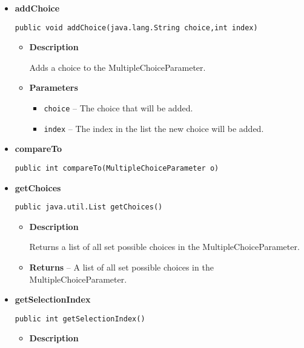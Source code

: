 {{{{{{{\begin{itemize}
{\begin{itemize}
{Let the visitor visit this parameter.
}
\item{
{\bf  Parameters}
  \begin{itemize}
   \item{
\texttt{visitor} -- The visitor to visit}
  \end{itemize}
}%
\end{itemize}
}%
\item{ 
{\bf  addChoice}\\
\begin{lstlisting}[frame=none]
public void addChoice(java.lang.String choice,int index)\end{lstlisting} %
\begin{itemize}
\item{
{\bf  Description}

Adds a choice to the MultipleChoiceParameter.
}
\item{
{\bf  Parameters}
  \begin{itemize}
   \item{
\texttt{choice} -- The choice that will be added.}
   \item{
\texttt{index} -- The index in the list the new choice will be added.}
  \end{itemize}
}%
\end{itemize}
}%
\item{ 
{\bf  compareTo}\\
\begin{lstlisting}[frame=none]
public int compareTo(MultipleChoiceParameter o)\end{lstlisting} %
}%
\item{ 
{\bf  getChoices}\\
\begin{lstlisting}[frame=none]
public java.util.List getChoices()\end{lstlisting} %
\begin{itemize}
\item{
{\bf  Description}

Returns a list of all set possible choices in the MultipleChoiceParameter.
}
\item{{\bf  Returns} -- 
A list of all set possible choices in the MultipleChoiceParameter. 
}%
\end{itemize}
}%
\item{ 
{\bf  getSelectionIndex}\\
\begin{lstlisting}[frame=none]
public int getSelectionIndex()\end{lstlisting} %
\begin{itemize}
\item{
{\bf  Description}

}
\end{itemize}}
\end{itemize}}}}}}}}
